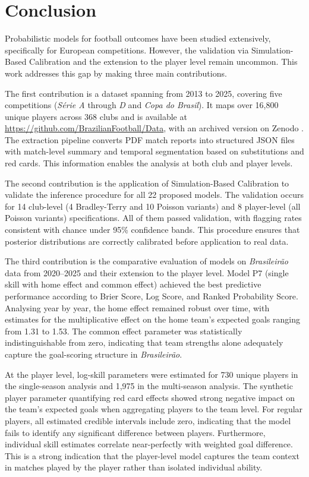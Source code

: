 \chapter{Conclusion}
\label{conclusion}

Probabilistic models for football outcomes have been studied extensively, specifically for European competitions.
However, the validation via Simulation-Based Calibration and the extension to the player level remain uncommon.
This work addresses this gap by making three main contributions.

The first contribution is a dataset spanning from 2013 to 2025, covering five competitions (\textit{Série A} through \textit{D} and \textit{Copa do Brasil}).
It maps over 16,800 unique players across 368 clubs and is available at \url{https://github.com/BrazilianFootball/Data}, with an archived version on Zenodo \cite{michels_2026_dataset}.
The extraction pipeline converts PDF match reports into structured JSON files with match-level summary and temporal segmentation based on substitutions and red cards.
This information enables the analysis at both club and player levels.

The second contribution is the application of Simulation-Based Calibration to validate the inference procedure for all 22 proposed models.
The validation occurs for 14 club-level (4 Bradley-Terry and 10 Poisson variants) and 8 player-level (all Poisson variants) specifications.
All of them passed validation, with flagging rates consistent with chance under 95\% confidence bands.
This procedure ensures that posterior distributions are correctly calibrated before application to real data.

The third contribution is the comparative evaluation of models on \textit{Brasileirão} data from 2020--2025 and their extension to the player level.
Model P7 (single skill with home effect and common effect) achieved the best predictive performance according to Brier Score, Log Score, and Ranked Probability Score.
Analysing year by year, the home effect remained robust over time, with estimates for the multiplicative effect on the home team's expected goals ranging from 1.31 to 1.53.
The common effect parameter was statistically indistinguishable from zero, indicating that team strengths alone adequately capture the goal-scoring structure in \textit{Brasileirão}.

At the player level, log-skill parameters were estimated for 730 unique players in the single-season analysis and 1,975 in the multi-season analysis.
The synthetic player parameter quantifying red card effects showed strong negative impact on the team's expected goals when aggregating players to the team level.
For regular players, all estimated credible intervals include zero, indicating that the model fails to identify any significant difference between players.
Furthermore, individual skill estimates correlate near-perfectly with weighted goal difference.
This is a strong indication that the player-level model captures the team context in matches played by the player rather than isolated individual ability.

